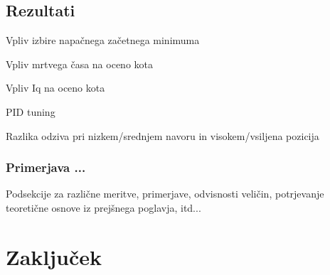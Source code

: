 \documentclass[a4paper,twoside,openright,12pt,slovene]{book}
\begin{document}


\section{Rezultati} \label{rezultati}

Vpliv izbire napačnega začetnega minimuma

Vpliv mrtvega časa na oceno kota

Vpliv Iq na oceno kota

PID tuning

Razlika odziva pri nizkem/srednjem navoru in visokem/vsiljena pozicija

\subsection{Primerjava ...} \label{graf1}

Podsekcije za različne meritve, primerjave, odvisnosti veličin, potrjevanje teoretične osnove iz prejšnega poglavja, itd...

\chapter{Zaključek} \label{zakljucek}


\cleardoublepage{} %





\appendix
\end{document}
